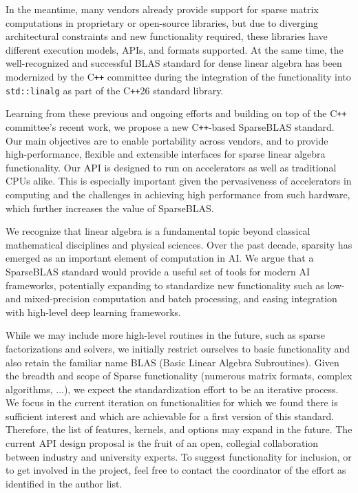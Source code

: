 \documentclass[manuscript,review]{acmart}
\newcommand{\cplusplus}{C\texttt{++}\xspace}
\newcommand{\cppstd}[1]{C\texttt{++}#1\xspace}
\begin{document}
In the meantime, many vendors already provide support for sparse matrix computations in proprietary or open-source libraries, but due to diverging architectural constraints and new functionality required, these libraries have different execution models, APIs, and formats supported. At the same time, the well-recognized and successful BLAS standard for dense linear algebra has been modernized by the \cplusplus committee during the integration of the functionality into \texttt{std::linalg} as part of the \cppstd{26} standard library.

Learning from these previous and ongoing efforts and building on top of the \cplusplus committee's recent work, we propose a new \cplusplus-based SparseBLAS standard. Our main objectives are to enable portability across vendors, and to provide high-performance, flexible and extensible interfaces for sparse linear algebra functionality. Our API is designed to run on accelerators as well as traditional CPUs alike. This is especially important given the pervasiveness of accelerators in computing and the challenges in achieving high performance from such hardware, which further increases the value of SparseBLAS.

We recognize that linear algebra is a fundamental topic beyond classical mathematical disciplines and physical sciences. Over the past decade, sparsity has emerged as an important element of computation in AI. We argue that a SparseBLAS standard would provide a useful set of tools for modern AI frameworks, potentially expanding to standardize new functionality such as low- and mixed-precision computation and batch processing, and easing integration with high-level deep learning frameworks.

While we may include more high-level routines in the future, such as sparse factorizations and solvers, we initially restrict ourselves to basic functionality and also retain the familiar name BLAS (Basic Linear Algebra Subroutines). Given the breadth and scope of Sparse functionality (numerous matrix formats, complex algorithms, ...), we expect the standardization effort to be an iterative process. We focus in the current iteration on functionalities for which we found there is sufficient interest and which are achievable for a first version of this standard. Therefore, the list of features, kernels, and options may expand in the future. The current API design proposal is the fruit of an open, collegial collaboration between industry and university experts. To suggest functionality for inclusion, or to get involved in the project, feel free to contact the coordinator of the effort as identified in the author list.
\end{document}
